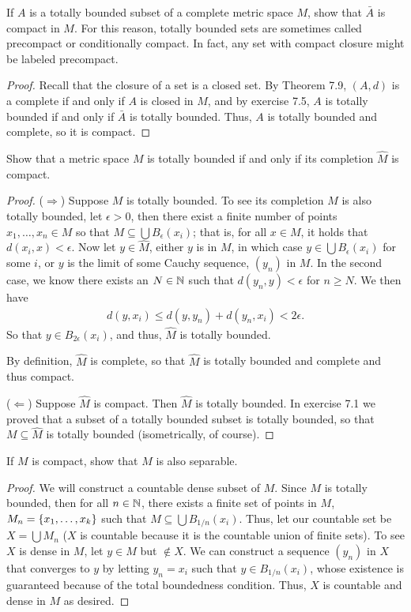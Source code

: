 \begin{exercise}{15}
If $A$ is a totally bounded subset of a complete metric space $M$, show that $\bar{A}$ is compact in $M$.
For this reason, totally bounded sets are sometimes called precompact or conditionally compact.
In fact, any set with compact closure might be labeled precompact.
\end{exercise}
\begin{proof}
Recall that the closure of a set is a closed set.
By Theorem 7.9, $(A,d)$ is a complete if and only if $A$ is closed in $M$, and by exercise 7.5, $A$ is totally bounded if and only if $\bar{A}$ is totally bounded.
Thus, $A$ is totally bounded and complete, so it is compact.
\end{proof} 

\begin{exercise}{16}
Show that a metric space $M$ is totally bounded if and only if its completion $\hat{M}$ is compact.
\end{exercise}
\begin{proof}
($\Rightarrow$)
Suppose $M$ is totally bounded.
To see its completion $\hat{M}$ is also totally bounded, let $\epsilon>0$, then there exist a finite number of points $x_1,\dots,x_n\in M$ so that $M\subseteq\bigcup B_\epsilon(x_i)$;
that is, for all $x\in M$, it holds that $d(x_i,x)<\epsilon$.
Now let $y\in \hat{M}$, either $y$ is in $M$, in which case $y\in\bigcup B_\epsilon(x_i)$ for some $i$, or $y$ is the limit of some Cauchy sequence, $(y_n)$ in $M$.
In the second case, we know there exists an $N\in\mathbb{N}$ such that $d(y_n,y)<\epsilon$ for $n\geq N$.
We then have
\begin{align*}
    d(y,x_i) \leq d(y,y_n) + d(y_n,x_i) < 2\epsilon.
\end{align*}
So that $y\in B_{2\epsilon}(x_i)$, and thus, $\hat{M}$ is totally bounded.

By definition, $\hat{M}$ is complete, so that $\hat{M}$ is totally bounded and complete and thus compact.

($\Leftarrow$)
Suppose $\hat{M}$ is compact.
Then $\hat{M}$ is totally bounded.
In exercise 7.1 we proved that a subset of a totally bounded subset is totally bounded, so that $M\subseteq\hat{M}$ is totally bounded (isometrically, of course).
\end{proof} 

\begin{exercise}{17}
If $M$ is compact, show that $M$ is also separable.
\end{exercise}
\begin{proof}
We will construct a countable dense subset of $M$.
Since $M$ is totally bounded, then for all $n\in\mathbb{N}$, there exists a finite set of points in $M$, $M_n=\{x_1,\dots,x_k\}$ such that $M\subseteq\bigcup B_{1/n}(x_i)$.
Thus, let our countable set be $X=\bigcup M_n$ ($X$ is countable because it is the countable union of finite sets).
To see $X$ is dense in $M$, let $y\in M$ but $\notin X$.
We can construct a sequence $(y_n)$ in $X$ that converges to $y$ by letting $y_n=x_i$ such that $y\in B_{1/n}(x_i)$, whose existence is guaranteed because of the total boundedness condition.
Thus, $X$ is countable and dense in $M$ as desired.
\end{proof} 

